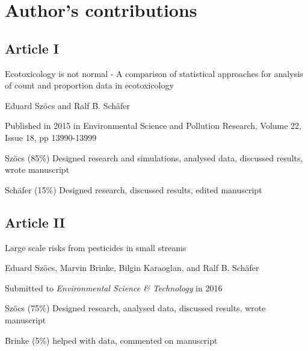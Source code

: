 

\chapter{Author's contributions}

\begin{sloppypar}
\vspace{-1em}
\section*{Article I}
\vspace{-1em}
\small
\begin{description}
    \setlength\itemsep{0em}
	\item[Title:] Ecotoxicology is not normal - A comparison of statistical approaches for analysis of count and proportion data in ecotoxicology
	\item[Authors:] Eduard Szöcs and Ralf B. Schäfer
	\item[Status:] Published in 2015 in Environmental Science and Pollution Research, Volume 22, Issue 18, pp 13990-13999
	\item[Contributions:] Szöcs (85\%) Designed research and simulations, analysed data, discussed results, wrote manuscript 

	Schäfer (15\%) Designed research, discussed results, edited manuscript
\end{description}
\normalsize

\vspace{-1em}
\section*{Article II}
\vspace{-1em}
\small
\begin{description}
    \setlength\itemsep{0em}
	\item[Title:] Large scale risks from pesticides in small streams
	\item[Authors:] Eduard Szöcs, Marvin Brinke, Bilgin Karaoglan, and Ralf B. Schäfer
	\item[Status:] Submitted to \emph{Environmental Science \& Technology} in 2016
	\item[Contributions:] Szöcs (75\%) Designed research, analysed data, discussed results, wrote manuscript

	Brinke (5\%) helped with data, commented on manuscript


\end{description}
\end{sloppypar}
